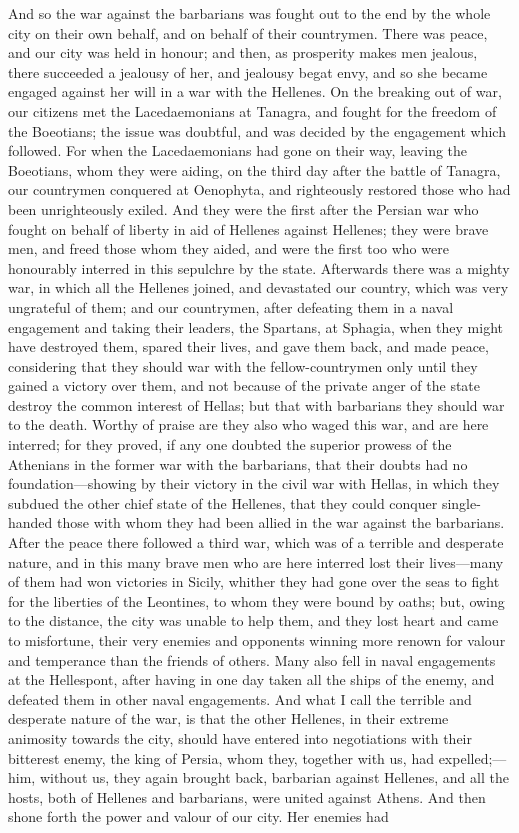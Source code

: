 \documentclass[11pt,letter]{article}
\begin{document}
\par  And so the war against the barbarians was fought out to the end by the whole city on their own behalf, and on behalf of their countrymen. There was peace, and our city was held in honour; and then, as prosperity makes men jealous, there succeeded a jealousy of her, and jealousy begat envy, and so she became engaged against her will in a war with the Hellenes. On the breaking out of war, our citizens met the Lacedaemonians at Tanagra, and fought for the freedom of the Boeotians; the issue was doubtful, and was decided by the engagement which followed. For when the Lacedaemonians had gone on their way, leaving the Boeotians, whom they were aiding, on the third day after the battle of Tanagra, our countrymen conquered at Oenophyta, and righteously restored those who had been unrighteously exiled. And they were the first after the Persian war who fought on behalf of liberty in aid of Hellenes against Hellenes; they were brave men, and freed those whom they aided, and were the first too who were honourably interred in this sepulchre by the state. Afterwards there was a mighty war, in which all the Hellenes joined, and devastated our country, which was very ungrateful of them; and our countrymen, after defeating them in a naval engagement and taking their leaders, the Spartans, at Sphagia, when they might have destroyed them, spared their lives, and gave them back, and made peace, considering that they should war with the fellow-countrymen only until they gained a victory over them, and not because of the private anger of the state destroy the common interest of Hellas; but that with barbarians they should war to the death. Worthy of praise are they also who waged this war, and are here interred; for they proved, if any one doubted the superior prowess of the Athenians in the former war with the barbarians, that their doubts had no foundation—showing by their victory in the civil war with Hellas, in which they subdued the other chief state of the Hellenes, that they could conquer single-handed those with whom they had been allied in the war against the barbarians. After the peace there followed a third war, which was of a terrible and desperate nature, and in this many brave men who are here interred lost their lives—many of them had won victories in Sicily, whither they had gone over the seas to fight for the liberties of the Leontines, to whom they were bound by oaths; but, owing to the distance, the city was unable to help them, and they lost heart and came to misfortune, their very enemies and opponents winning more renown for valour and temperance than the friends of others. Many also fell in naval engagements at the Hellespont, after having in one day taken all the ships of the enemy, and defeated them in other naval engagements. And what I call the terrible and desperate nature of the war, is that the other Hellenes, in their extreme animosity towards the city, should have entered into negotiations with their bitterest enemy, the king of Persia, whom they, together with us, had expelled;—him, without us, they again brought back, barbarian against Hellenes, and all the hosts, both of Hellenes and barbarians, were united against Athens. And then shone forth the power and valour of our city. Her enemies had 
\end{document}
